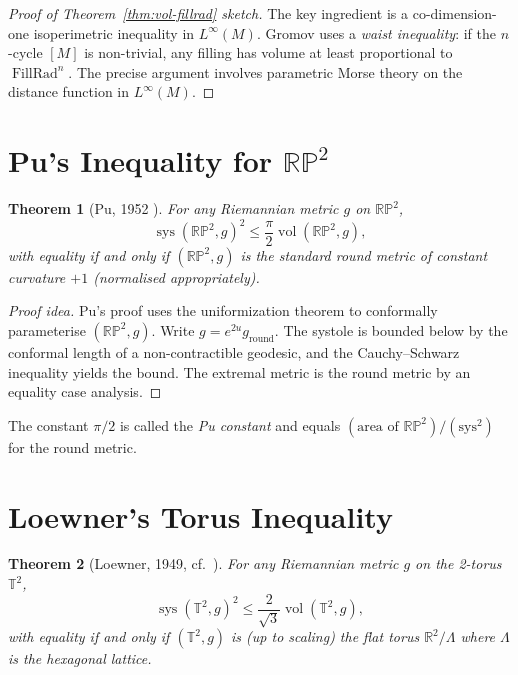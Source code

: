 \documentclass[12pt,a4paper]{amsart}
\newtheorem{theorem}{Theorem}[section]
\theoremstyle{definition}
\theoremstyle{remark}
\DeclareMathOperator{\sys}{sys}
\DeclareMathOperator{\FillRad}{FillRad}
\DeclareMathOperator{\vol}{vol}
\newcommand{\RR}{\mathbb{R}}
\newcommand{\RP}{\mathbb{RP}}
\newcommand{\TT}{\mathbb{T}}
\begin{document}
\begin{proof}[Proof of Theorem~\ref{thm:vol-fillrad} sketch]
The key ingredient is a co-dimension-one isoperimetric inequality in
$L^\infty(M)$.  Gromov uses a \emph{waist inequality}: if the $n$-cycle
$[M]$ is non-trivial, any filling has volume at least proportional to
$\FillRad^n$.  The precise argument involves parametric Morse theory on the
distance function in $L^\infty(M)$.
\end{proof}

\section{Pu's Inequality for $\RP^2$}

\begin{theorem}[Pu, 1952 \cite{Pu1952}]
For any Riemannian metric $g$ on $\RP^2$,
\[
  \sys(\RP^2, g)^2 \le \frac{\pi}{2} \vol(\RP^2, g),
\]
with equality if and only if $(\RP^2, g)$ is the standard round metric of
constant curvature $+1$ (normalised appropriately).
\end{theorem}

\begin{proof}[Proof idea]
Pu's proof uses the uniformization theorem to conformally parameterise
$(\RP^2, g)$.  Write $g = e^{2u} g_{\mathrm{round}}$.  The systole is bounded
below by the conformal length of a non-contractible geodesic, and the
Cauchy--Schwarz inequality yields the bound.  The extremal metric is the
round metric by an equality case analysis.
\end{proof}

The constant $\pi/2$ is called the \emph{Pu constant} and equals
$(\text{area of }\RP^2)/(\text{sys}^2)$ for the round metric.

\section{Loewner's Torus Inequality}

\begin{theorem}[Loewner, 1949, cf.\ \cite{Pu1952}]
For any Riemannian metric $g$ on the 2-torus $\TT^2$,
\[
  \sys(\TT^2, g)^2 \le \frac{2}{\sqrt{3}} \vol(\TT^2, g),
\]
with equality if and only if $(\TT^2, g)$ is (up to scaling) the flat torus
$\RR^2 / \Lambda$ where $\Lambda$ is the hexagonal lattice.
\end{theorem}
\end{document}
